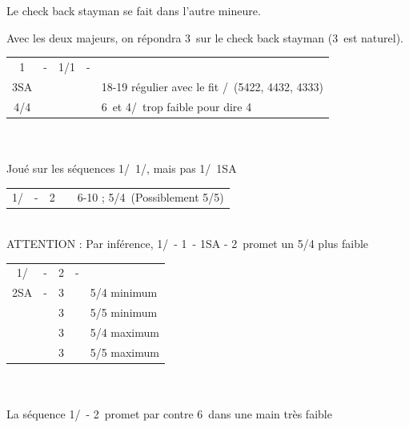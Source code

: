\documentclass[a4paper, oneside, 11pt]{report}
\begin{document}
		Le check back stayman se fait dans l'autre mineure.

		Avec les deux majeurs, on répondra 3\coeur\ sur le check back stayman (3\carreau\ est naturel).\\


		\begin{tabular}{cccc|l}
		1\trefle & - & 1\coeur/1\pique & - &\\
		3SA &&&& 18-19 régulier avec le fit \coeur/\pique\ (5422, 4432, 4333)\\
		4\coeur/4\pique &&&& 6\trefle\ et 4\coeur/\pique\ trop faible pour dire 4\trefle\\
		\end{tabular}\\\\

		Joué sur les séquences 1\trefle/\carreau\ 1\coeur/\pique,  mais pas 1\trefle/\carreau\ 1SA\\

\newpage

		\begin{tabular}{cccc|l}
		1\trefle/\carreau & - & 2\coeur && 6-10 ; 5\pique/4\coeur\ (Possiblement 5/5)\\
		\end{tabular}\\
		ATTENTION : Par inférence, 1\trefle/\carreau\ - 1\pique\ - 1SA - 2\coeur\ promet un 5/4 plus faible\\
	
		\begin{tabular}{cccc|l}
		1\trefle/\carreau & - & 2\coeur & - &\\
		2SA & - & 3\trefle && 5/4 minimum\\
		&& 3\carreau && 5/5 minimum\\
		&& 3\coeur && 5/4 maximum\\
		&& 3\pique && 5/5 maximum\\
		\end{tabular}\\\\
	
		La séquence 1\trefle/\carreau\ - 2\pique\ promet par contre 6\pique\ dans une main très faible\\
\end{document}
